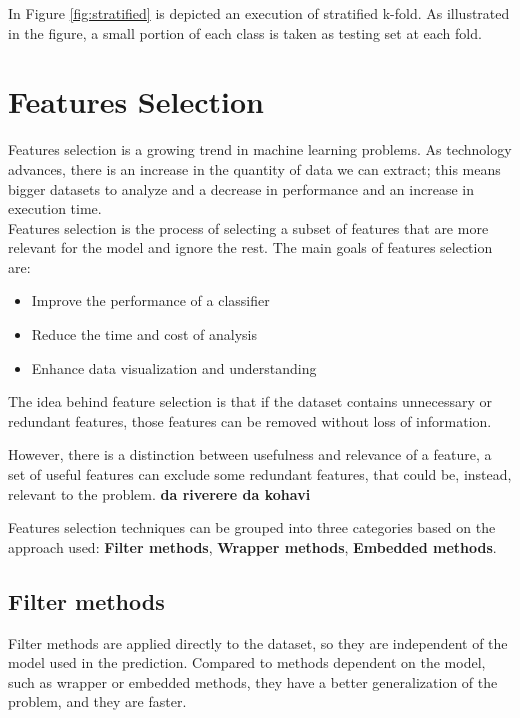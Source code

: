 In Figure \ref{fig:stratified} is depicted an execution of stratified k-fold. As illustrated in the figure, a small portion of each class is taken as testing set at each fold.





\section{Features Selection}
\label{sec:feat_sel}
Features selection is a growing trend in machine learning problems. As technology advances, there is an increase in the quantity of data we can extract; this means bigger datasets to analyze and a decrease in performance and an increase in execution time. \\

Features selection is the process of selecting a subset of features that are more relevant for the model and ignore the rest.
The main goals of features selection are: \cite{guyon2003introduction}
\begin{itemize}
	\item Improve the performance of a classifier
	\item Reduce the time and cost of analysis
	\item Enhance data visualization and understanding
\end{itemize}

The idea behind feature selection is that if the dataset contains unnecessary or redundant features, those features can be removed without loss of information. \cite{bermingham2015application}

However, there is a distinction between usefulness and relevance of a feature, a set of useful features can exclude some redundant features, that could be, instead, relevant to the problem.\cite{kohavi1997wrappers} \textbf{da riverere da kohavi}

Features selection techniques can be grouped into three categories based on the approach used: \textbf{Filter methods}, \textbf{Wrapper methods}, \textbf{Embedded methods}.

\subsection{Filter methods}
Filter methods are applied directly to the dataset, so they are independent of the model used in the prediction. Compared to methods dependent on the model, such as wrapper or embedded methods, they have a better generalization of the problem, and they are faster. \cite{kohavi1997wrappers}

